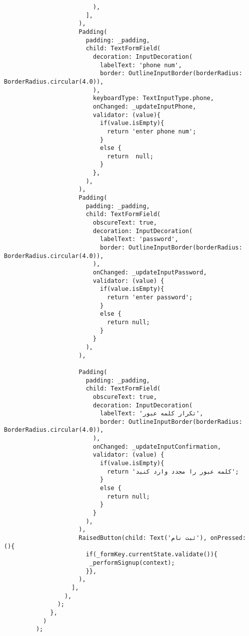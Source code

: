 \documentclass{article}
\begin{document}
\begin{lstlisting}
                         ),
                       ],
                     ),
                     Padding(
                       padding: _padding,
                       child: TextFormField(
                         decoration: InputDecoration(
                           labelText: 'phone num',
                           border: OutlineInputBorder(borderRadius: BorderRadius.circular(4.0)),
                         ),
                         keyboardType: TextInputType.phone,
                         onChanged: _updateInputPhone,
                         validator: (value){
                           if(value.isEmpty){
                             return 'enter phone num';
                           }
                           else {
                             return  null;
                           }
                         },
                       ),
                     ),
                     Padding(
                       padding: _padding,
                       child: TextFormField(
                         obscureText: true,
                         decoration: InputDecoration(
                           labelText: 'password',
                           border: OutlineInputBorder(borderRadius: BorderRadius.circular(4.0)),
                         ),
                         onChanged: _updateInputPassword,
                         validator: (value) {
                           if(value.isEmpty){
                             return 'enter password';
                           }
                           else {
                             return null;
                           }
                         }
                       ),
                     ),

                     Padding(
                       padding: _padding,
                       child: TextFormField(
                         obscureText: true,
                         decoration: InputDecoration(
                           labelText: 'تکرار کلمه عبور',
                           border: OutlineInputBorder(borderRadius: BorderRadius.circular(4.0)),
                         ),
                         onChanged: _updateInputConfirmation,
                         validator: (value) {
                           if(value.isEmpty){
                             return 'کلمه عبور را مجدد وارد کنید';
                           }
                           else {
                             return null;
                           }
                         }
                       ),
                     ),
                     RaisedButton(child: Text('ثبت نام'), onPressed: (){
                       if(_formKey.currentState.validate()){
                        _performSignup(context);
                       }},
                     ),
                   ],
                 ),
               );
             },
           )
         );


\end{lstlisting}
\end{document}
